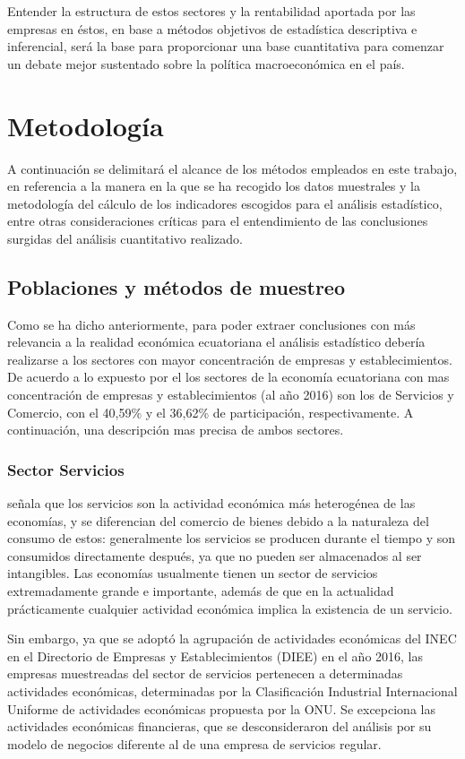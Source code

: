 \documentclass[12pt,a4paper,twoside]{article}
\begin{document}
Entender la estructura de estos sectores y la rentabilidad aportada por las empresas en éstos, en base a métodos objetivos de estadística descriptiva e inferencial, será la base para proporcionar una base cuantitativa para comenzar un debate mejor sustentado sobre la política macroeconómica en el país.

\clearpage
\section{Metodología}\label{sec:metodos}
A continuación se delimitará el alcance de los métodos empleados en este trabajo, en referencia a la manera en la que se ha recogido los datos muestrales y la metodología del cálculo de los indicadores escogidos para el análisis estadístico, entre otras consideraciones críticas para el entendimiento de las conclusiones surgidas del análisis cuantitativo realizado.

\subsection{Poblaciones y métodos de muestreo}\label{subsec:pob}
Como se ha dicho anteriormente, para poder extraer conclusiones con más relevancia a la realidad económica ecuatoriana el análisis estadístico debería realizarse a los sectores con mayor concentración de empresas y establecimientos. De acuerdo a lo expuesto por el \textcite{directoriodeinstitutodeestadisticaycensos} los sectores de la economía ecuatoriana con mas concentración de empresas y establecimientos (al año 2016) son los de Servicios y Comercio, con el 40,59\% y el 36,62\% de participación, respectivamente. A continuación, una descripción mas precisa de ambos sectores.\par
\subsubsection{Sector Servicios}\label{subsubsec:servicios}
\textcite{elsectorserrano} señala que los servicios son la actividad económica más heterogénea de las economías, y se diferencian del comercio de bienes debido a la naturaleza del consumo de estos: generalmente los servicios se producen durante el tiempo y son consumidos directamente después, ya que no pueden ser almacenados al ser intangibles. Las economías usualmente tienen un sector de servicios extremadamente grande e importante, además de que en la actualidad prácticamente cualquier actividad económica implica la existencia de un servicio.\par
Sin embargo, ya que se adoptó la agrupación de actividades económicas del INEC en el Directorio de Empresas y Establecimientos (DIEE) en el año 2016, las empresas muestreadas del sector de servicios pertenecen a determinadas actividades económicas, determinadas por la Clasificación Industrial Internacional Uniforme de actividades económicas propuesta por la ONU. Se excepciona las actividades económicas financieras, que se desconsideraron del análisis por su modelo de negocios diferente al de una empresa de servicios regular.
\end{document}
